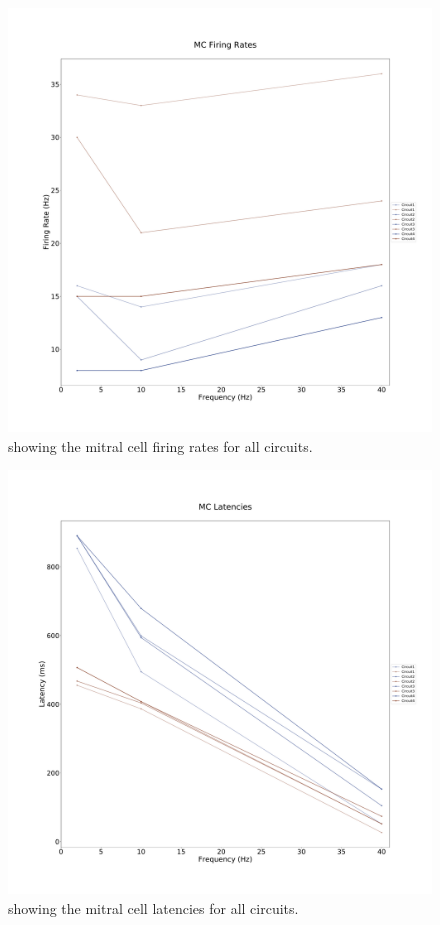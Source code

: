 \documentclass[11pt]{report}
\begin{document}
\begin{figure}[!ht]
\centering
\includegraphics[scale=0.3]{Figures/MC_firing_rate.pdf}
\caption{showing the mitral cell firing rates for all circuits.}
\label{fig:MC_FR_AllC}
\end{figure} 

\begin{figure}[!ht]
\centering
\includegraphics[scale=0.3]{Figures/MC_latencies.pdf}
\caption{showing the mitral cell latencies for all circuits.}
\label{fig:MC_L_AllC}
\end{figure}
\end{document}
